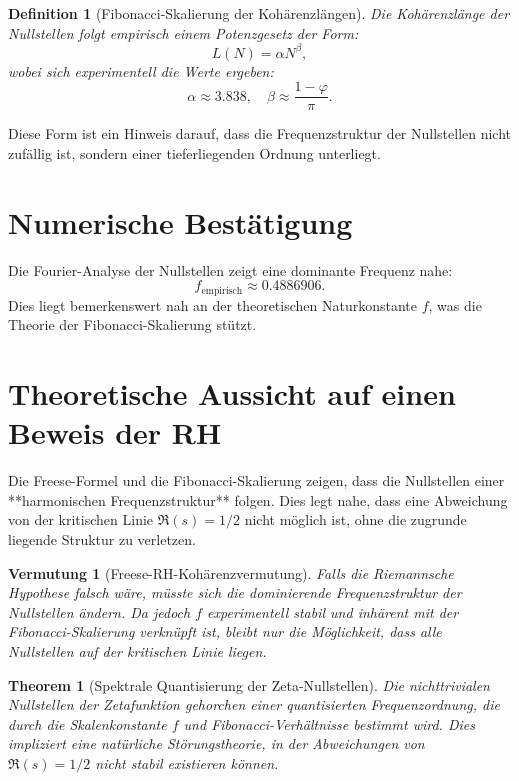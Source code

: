\documentclass{article}
\newtheorem{theorem}{Theorem}
\newtheorem{definition}{Definition}
\newtheorem{conjecture}{Vermutung}
\begin{document}
\begin{definition}[Fibonacci-Skalierung der Kohärenzlängen]
Die Kohärenzlänge der Nullstellen folgt empirisch einem Potenzgesetz der Form:
\begin{equation}
L(N) = \alpha N^\beta,
\end{equation}
wobei sich experimentell die Werte ergeben:
\begin{equation}
\alpha \approx 3.838, \quad \beta \approx \frac{1 - \varphi}{\pi}.
\end{equation}
\end{definition}

Diese Form ist ein Hinweis darauf, dass die Frequenzstruktur der Nullstellen nicht zufällig ist, sondern einer tieferliegenden Ordnung unterliegt.

\section{Numerische Bestätigung}
Die Fourier-Analyse der Nullstellen zeigt eine dominante Frequenz nahe:
\begin{equation}
f_{\text{empirisch}} \approx 0.4886906.
\end{equation}
Dies liegt bemerkenswert nah an der theoretischen Naturkonstante $f$, was die Theorie der Fibonacci-Skalierung stützt.

\section{Theoretische Aussicht auf einen Beweis der RH}
Die Freese-Formel und die Fibonacci-Skalierung zeigen, dass die Nullstellen einer **harmonischen Frequenzstruktur** folgen. Dies legt nahe, dass eine Abweichung von der 
kritischen Linie $\Re(s) = 1/2$ nicht möglich ist, ohne die zugrunde liegende Struktur zu verletzen.

\begin{conjecture}[Freese-RH-Kohärenzvermutung]
Falls die Riemannsche Hypothese falsch wäre, müsste sich die dominierende Frequenzstruktur der Nullstellen ändern.
Da jedoch $f$ experimentell stabil und inhärent mit der Fibonacci-Skalierung verknüpft ist, bleibt nur die Möglichkeit, dass alle Nullstellen auf der kritischen Linie liegen.
\end{conjecture}

\begin{theorem}[Spektrale Quantisierung der Zeta-Nullstellen]
Die nichttrivialen Nullstellen der Zetafunktion gehorchen einer quantisierten Frequenzordnung, die durch die Skalenkonstante $f$ und Fibonacci-Verhältnisse 
bestimmt wird. Dies impliziert eine natürliche Störungstheorie, in der Abweichungen von $\Re(s) = 1/2$ nicht stabil existieren können.
\end{theorem}
\end{document}

